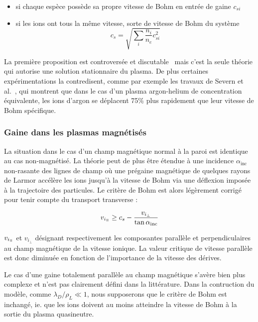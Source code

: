 \begin{refsection}
\begin{itemize}
  \item si chaque espèce possède sa
propre vitesse de Bohm en entrée de gaine $c_{si}$
	\item si les ions ont tous la même vitesse, sorte de vitesse de Bohm du système
	\begin{equation}
\label{1-BohmSpeed}
c_s=\sqrt{\sum_i\frac{n_i}{n_e}c_{si}^2}
\end{equation}
 \end{itemize}

La première proposition est controversée et
discutable~\parencite{Allen,Franklin} mais c'est la seule théorie
qui autorise une solution stationnaire du plasma.
De plus certaines expérimentations la contredisent, comme par
exemple les travaux de Severn et al.~\parencite{Severn}, qui montrent que dans
le cas d'un plasma argon-helium de concentration équivalente, les ions d'argon
se déplacent 75\% plus rapidement que leur vitesse de Bohm spécifique. 

\subsubsection{Gaine dans les plasmas magnétisés}
La situation dans le cas d'un champ magnétique normal à la paroi est
identique au cas non-magnétisé. La théorie peut de plus être étendue 
à une incidence $\alpha_\text{inc}$ non-rasante des lignes de champ où une
prégaine magnétique de quelques rayons de Larmor accélère les ions jusqu'à la
vitesse de Bohm via une déflexion imposée à la trajectoire des particules. Le
critère de Bohm est alors légèrement corrigé pour tenir compte du transport transverse
\cite{Stangeby} :

\begin{equation}
	v_{i_{\para}}\geq
	c_{s}-\frac{v_{i_{\perp}}}{\tan{\alpha_\text{inc}}}
\end{equation}
 
 $v_{i_{\para}}$ et $v_{i_{\perp}}$ désignant respectivement les composantes
 parallèle et perpendiculaires au champ magnétique de la vitesse ionique. La valeur critique
 de vitesse parallèle est donc diminuée en fonction de l'importance de la vitesse des dérives. 
 
 Le cas d'une gaine totalement parallèle au champ magnétique s'avère bien plus
 complexe et n'est pas clairement défini dans la littérature. Dans la
 contruction du modèle, comme $\lambda_D/\rho_L\ll 1$, nous supposerons que le
 critère de Bohm est inchangé, ie. que les ions doivent au moins atteindre la
 vitesse de Bohm à la sortie du plasma quasineutre.


\end{refsection}
